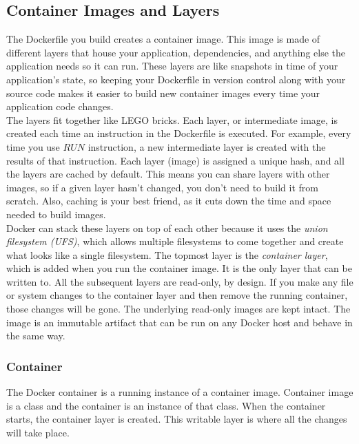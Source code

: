 \documentclass{article}
\begin{document}
\subsection{Container Images and Layers}
The Dockerfile you build creates a container image. This image is made of different layers that house your application, dependencies, and anything else the application needs so it can run. These layers are like snapshots in time of your application's state, so keeping your Dockerfile in version control along with your source code makes it easier to build new container images every time your application code changes. \\
The layers fit together like LEGO bricks. Each layer, or intermediate image, is created each time an instruction in the Dockerfile is executed. For example, every time you use $RUN$ instruction, a new intermediate layer is created with the results of that instruction. Each layer (image) is assigned a unique hash, and all the layers are cached by default.  This means you can share layers with other images, so if  a given layer hasn't changed, you don't need to build it from scratch. Also, caching is your best friend, as it cuts down the time and space needed to build images. \\
Docker can stack these layers on top of each other because it uses the \textit{union filesystem (UFS)}, which allows multiple filesystems to come together and create what looks like a single filesystem. The topmost layer is the \textit{container layer}, which is added when you run the container image. It is the only layer that can be written to. All the subsequent layers are read-only, by design. If you make any file or system changes to the container layer and then remove the running container, those changes will be gone. The underlying read-only images are kept intact. The image is an immutable artifact that can be run on any Docker host and behave in the same way. \\
\subsubsection{Container}
The Docker container is a running instance of a container image. Container image is a class and the container is an instance of that class. When the container starts, the container layer is created. This writable layer is where all the changes will take place.
\end{document}
